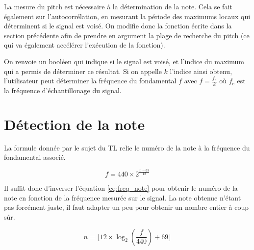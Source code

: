 \documentclass[french]{article}
\begin{document}
La mesure du pitch est nécessaire à la détermination de la note. Cela se fait également sur l'autocorrélation, en mesurant la période des maximums locaux qui déterminent si le signal est voisé. On modifie donc la fonction écrite dans la section précédente afin de prendre en argument la plage de recherche du pitch (ce qui va également accélérer l'exécution de la fonction). 

On renvoie un booléen qui indique si le signal est voisé, et l'indice du maximum qui a permis de déterminer ce résultat. Si on appelle $k$ l'indice ainsi obtenu, l'utilisateur peut déterminer la fréquence du fondamental $f$ avec $f = \frac{f_e}{k}$ où $f_e$ est la fréquence d'échantillonage du signal.

\section{Détection de la note}

La formule donnée par le sujet du TL relie le numéro de la note à la fréquence du fondamental associé.

\begin{equation}
f = 440 \times 2 ^{\frac{n - 69}{12}}
\label{eq:freq_note}
\end{equation}

Il suffit donc d'inverser l'équation \ref{eq:freq_note} pour obtenir le numéro de la note en fonction de la fréquence mesurée sur le signal. La note obtenue n'étant pas forcément juste, il faut adapter un peu pour obtenir un nombre entier à coup sûr.

\begin{equation}
n = \lfloor 12 \times \log_2\left(\frac{f}{440}\right) + 69 \rfloor
\end{equation}
\end{document}
